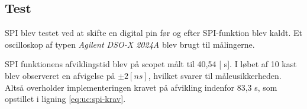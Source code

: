 \subsection{Test} 
%
%
%
%
%
%
SPI blev testet ved at skifte en digital pin før og efter SPI-funktion blev kaldt. Et oscilloskop af typen \textit{Agilent DSO-X 2024A} blev brugt til målingerne. 

SPI funktionens afviklingstid blev på scopet målt til 40,54 [ \micro s]. I løbet af 10 kast blev observeret en afvigelse på $\pm 2 [ ns]$, hvilket svarer til måleusikkerheden. 
Altså overholder implementeringen kravet på afvikling indenfor 83,3 \micro s, som opstillet i ligning \ref{eq:uc:spi-krav}.




